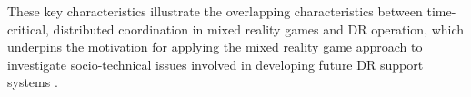 These key characteristics illustrate the overlapping characteristics between time-critical, distributed coordination in mixed reality games and \ac{DR} operation, which underpins the motivation for applying the mixed reality game approach to investigate socio-technical issues involved in developing future \ac{DR} support systems \citep{Fischer2012}.\\








